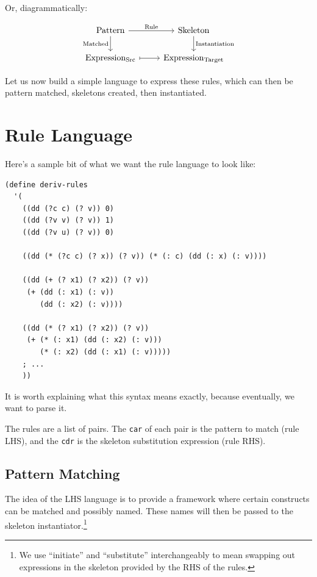 \documentclass[9pt]{report}
\begin{document}
Or, diagrammatically:

\[\begin{tikzcd} \mathrm{Pattern} \arrow{r}{\mathrm{Rule}}
\arrow[swap]{d}{\mathrm{Matched}} & \mathrm{Skeleton}
\arrow{d}{\mathrm{Instantiation}} \\ \mathrm{Expression_{Src}}
\arrow[mapsto]{r} & \mathrm{Expression_{Target}} \end{tikzcd} \]

Let us now build a simple language to express these rules, which can
then be pattern matched, skeletons created, then instantiated.

\section{Rule Language}
\label{sec:org4e39b17}

Here's a sample bit of what we want the rule language to look like:

\begin{verbatim}
(define deriv-rules
  '(
    ((dd (?c c) (? v)) 0)
    ((dd (?v v) (? v)) 1)
    ((dd (?v u) (? v)) 0)

    ((dd (* (?c c) (? x)) (? v)) (* (: c) (dd (: x) (: v))))

    ((dd (+ (? x1) (? x2)) (? v))
     (+ (dd (: x1) (: v))
        (dd (: x2) (: v))))

    ((dd (* (? x1) (? x2)) (? v))
     (+ (* (: x1) (dd (: x2) (: v)))
        (* (: x2) (dd (: x1) (: v)))))
    ; ...
    ))
\end{verbatim}

It is worth explaining what this syntax means exactly, because
eventually, we want to parse it.

The rules are a list of pairs. The \texttt{car} of each pair is the
pattern to match (rule LHS), and the \texttt{cdr} is the skeleton
substitution expression (rule RHS).

\subsection{Pattern Matching}
\label{sec:org0e94bd7}

The idea of the LHS language is to provide a framework where
certain constructs can be matched and possibly named. These names
will then be passed to the skeleton instantiator.\footnote{We use ``initiate'' and ``substitute'' interchangeably to mean
swapping out expressions in the skeleton provided by the RHS of the
rules.}
\end{document}
